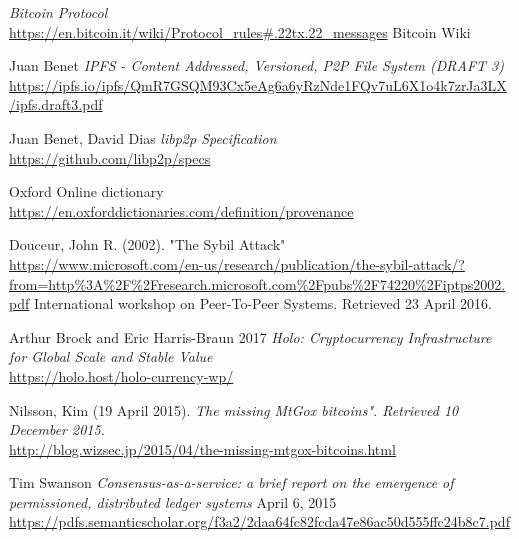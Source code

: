 \documentclass[twocolumn,showpacs,%
  nofootinbib,aps,superscriptaddress,%
  eqsecnum,prd,notitlepage,showkeys,10pt]{revtex4-1}
\begin{document}
\begin{thebibliography}{9}
\textit{Bitcoin Protocol}
\\\url{https://en.bitcoin.it/wiki/Protocol_rules#.22tx.22_messages}
Bitcoin Wiki

Juan Benet
\textit{IPFS - Content Addressed, Versioned, P2P File System (DRAFT 3)}
\\\url{https://ipfs.io/ipfs/QmR7GSQM93Cx5eAg6a6yRzNde1FQv7uL6X1o4k7zrJa3LX/ipfs.draft3.pdf}

Juan Benet, David Dias
\textit{libp2p Specification}
\\\url{https://github.com/libp2p/specs}

Oxford
Online dictionary
\\\url{https://en.oxforddictionaries.com/definition/provenance}

Douceur, John R. (2002).
"The Sybil Attack"
\\\url{https://www.microsoft.com/en-us/research/publication/the-sybil-attack/?from=http%3A%2F%2Fresearch.microsoft.com%2Fpubs%2F74220%2Fiptps2002.pdf}
International workshop on Peer-To-Peer Systems. Retrieved 23 April 2016.


Arthur Brock and Eric Harris-Braun 2017
\textit{Holo: Cryptocurrency Infrastructure
for Global Scale and Stable Value}
\\\url{https://holo.host/holo-currency-wp/}

 Nilsson, Kim (19 April 2015).
 \textit{The missing MtGox bitcoins". Retrieved 10 December 2015.}
\\\url{http://blog.wizsec.jp/2015/04/the-missing-mtgox-bitcoins.html}

Tim Swanson
\textit{Consensus-as-a-service: a brief report on the emergence of permissioned, distributed ledger systems}
April 6, 2015
\\\url{https://pdfs.semanticscholar.org/f3a2/2daa64fc82fcda47e86ac50d555ffc24b8c7.pdf}

\end{thebibliography}
\end{document}

